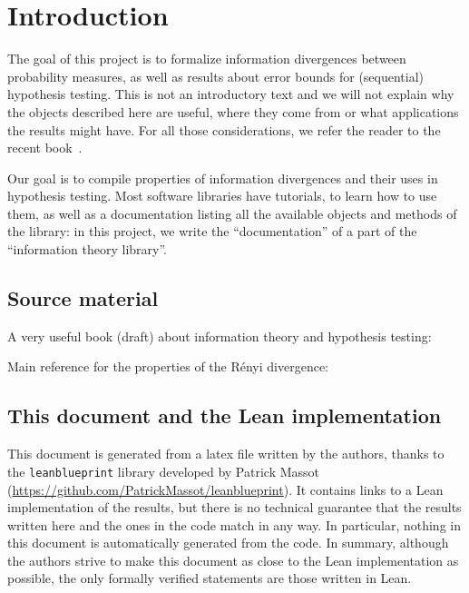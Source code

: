 \chapter*{Introduction}

The goal of this project is to formalize information divergences between probability measures, as well as results about error bounds for (sequential) hypothesis testing.
This is not an introductory text and we will not explain why the objects described here are useful, where they come from or what applications the results might have. For all those considerations, we refer the reader to the recent book~\cite{polyanskiy2024information}.

Our goal is to compile properties of information divergences and their uses in hypothesis testing. Most software libraries have tutorials, to learn how to use them, as well as a documentation listing all the available objects and methods of the library: in this project, we write the ``documentation'' of a part of the ``information theory library''.


\section*{Source material}

A very useful book (draft) about information theory and hypothesis testing: \cite{polyanskiy2024information} 

Main reference for the properties of the Rényi divergence: \cite{van2014renyi}


\section*{This document and the Lean implementation}

This document is generated from a latex file written by the authors, thanks to the \texttt{leanblueprint} library developed by Patrick Massot (\url{https://github.com/PatrickMassot/leanblueprint}). It contains links to a Lean implementation of the results, but there is no technical guarantee that the results written here and the ones in the code match in any way.
In particular, nothing in this document is automatically generated from the code.
In summary, although the authors strive to make this document as close to the Lean implementation as possible, the only formally verified statements are those written in Lean.

